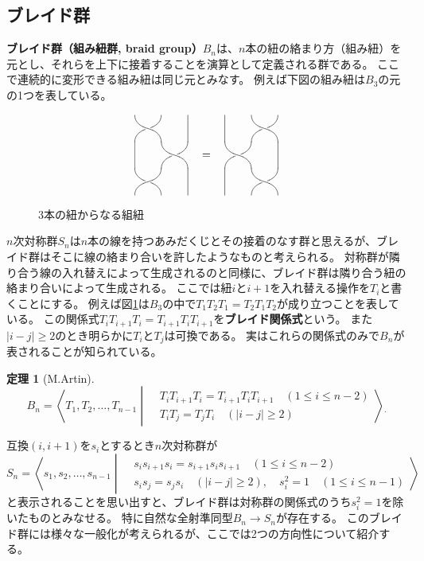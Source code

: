 \documentclass[a4j,uplatex,dvipdfmx]{jsarticle}
\numberwithin{equation}{section}
\numberwithin{figure}{section}
\theoremstyle{definition}
\newtheorem{theorem}{定理}[section]
\begin{document}
\subsection{ブレイド群}
\textbf{ブレイド群（組み紐群, braid group）}$B_n$は、$n$本の紐の絡まり方（組み紐）を元とし、それらを上下に接着することを演算として定義される群である。
ここで連続的に変形できる組み紐は同じ元とみなす。
例えば下図の組み紐は$B_3$の元の1つを表している。
\begin{figure}[h]
    \[
        \vcenter{\xy 0;/r2pc/:
        @={(0.5,-0.5),(0,0)}, @@{*{\vtwistneg}},(0,-2),\vtwist,
        @i@={(0,-1),(2,0),(2,-2)} @@{="save";"save"-(0,1),**@{-}}\endxy}
        \quad = \quad
        \vcenter{\xy 0;/r2pc/:
        @={(0.5,0),(0,-0.5),(0.5,-1)}, @@{*{\vtwistneg}},
        @i@={(0,0),(2,-1),(0,-2)} @@{="save";"save"-(0,1),**@{-}}\endxy}
    \]
    \caption{3本の紐からなる組紐}
    \label{fig:example-of-braid}
\end{figure}
$n$次対称群$S_n$は$n$本の線を持つあみだくじとその接着のなす群と思えるが、ブレイド群はそこに線の絡まり合いを許したようなものと考えられる。
対称群が隣り合う線の入れ替えによって生成されるのと同様に、ブレイド群は隣り合う紐の絡まり合いによって生成される。
ここでは紐$i$と$i+1$を入れ替える操作を$T_i$と書くことにする。
例えば図\ref{fig:example-of-braid}は$B_3$の中で$T_1T_2T_1 = T_2T_1T_2$が成り立つことを表している。
この関係式$T_iT_{i+1}T_i = T_{i+1}T_iT_{i+1}$を\textbf{ブレイド関係式}という。
また$|i-j| \geq 2$のとき明らかに$T_i$と$T_j$は可換である。
実はこれらの関係式のみで$B_n$が表されることが知られている。
\begin{theorem}[M.Artin]\label{thm:braid-group-as-artin-group}
    \begin{equation}
        B_n = \left\langle T_1, T_2, \dots, T_{n-1} \middle| \begin{split}
            &T_iT_{i+1}T_i = T_{i+1}T_iT_{i+1} \quad(1\leq i \leq n-2)\\
            &T_iT_j = T_jT_i\quad (|i-j| \geq 2)
        \end{split}\right\rangle {}_.
    \end{equation}
\end{theorem}
互換$(i, i+1)$を$s_i$とするとき$n$次対称群が
\begin{equation}
    S_n = \left\langle s_1, s_2, \dots, s_{n-1} \middle| \begin{split}
          &s_is_{i+1}s_i = s_{i+1}s_is_{i+1} \quad(1\leq i \leq n-2)\\
          &s_is_j = s_js_i\quad (|i-j| \geq 2), \quad s_i^2 = 1 \quad (1 \leq i \leq n-1)
      \end{split}\right\rangle
\end{equation}
と表示されることを思い出すと、ブレイド群は対称群の関係式のうち$s_i^2 = 1$を除いたものとみなせる。
特に自然な全射準同型$B_n \to S_n$が存在する。
このブレイド群には様々な一般化が考えられるが、ここでは2つの方向性について紹介する。
\end{document}
